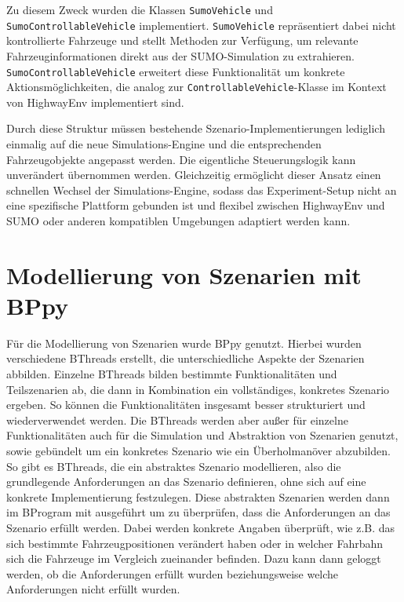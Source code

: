 Zu diesem Zweck wurden die Klassen \texttt{SumoVehicle} und \texttt{SumoControllableVehicle} implementiert. \texttt{SumoVehicle} repräsentiert dabei nicht kontrollierte Fahrzeuge und stellt Methoden zur Verfügung, um relevante Fahrzeuginformationen direkt aus der SUMO-Simulation zu extrahieren. \texttt{SumoControllableVehicle} erweitert diese Funktionalität um konkrete Aktionsmöglichkeiten, die analog zur \texttt{ControllableVehicle}-Klasse im Kontext von HighwayEnv implementiert sind.

Durch diese Struktur müssen bestehende Szenario-Implementierungen lediglich einmalig auf die neue Simulations-Engine und die entsprechenden Fahrzeugobjekte angepasst werden. Die eigentliche Steuerungslogik kann unverändert übernommen werden. Gleichzeitig ermöglicht dieser Ansatz einen schnellen Wechsel der Simulations-Engine, sodass das Experiment-Setup nicht an eine spezifische Plattform gebunden ist und flexibel zwischen HighwayEnv und SUMO oder anderen kompatiblen Umgebungen adaptiert werden kann.

\section{Modellierung von Szenarien mit BPpy}
Für die Modellierung von Szenarien wurde BPpy genutzt. Hierbei wurden verschiedene BThreads erstellt, die unterschiedliche Aspekte der Szenarien abbilden.
Einzelne BThreads bilden bestimmte Funktionalitäten und Teilszenarien ab, die dann in Kombination ein vollständiges, konkretes Szenario ergeben. So können die Funktionalitäten insgesamt besser strukturiert und wiederverwendet werden.
Die BThreads werden aber außer für einzelne Funktionalitäten auch für die Simulation und Abstraktion von Szenarien genutzt, sowie gebündelt um ein konkretes Szenario wie ein Überholmanöver abzubilden.
So gibt es BThreads, die ein abstraktes Szenario modellieren, also die grundlegende Anforderungen an das Szenario definieren, ohne sich auf eine konkrete Implementierung festzulegen. Diese abstrakten Szenarien werden dann im BProgram mit ausgeführt um zu überprüfen, dass die Anforderungen an das Szenario erfüllt werden.
Dabei werden konkrete Angaben überprüft, wie z.B. das sich bestimmte Fahrzeugpositionen verändert haben oder in welcher Fahrbahn sich die Fahrzeuge im Vergleich zueinander befinden.
Dazu kann dann geloggt werden, ob die Anforderungen erfüllt wurden beziehungsweise welche Anforderungen nicht erfüllt wurden.

